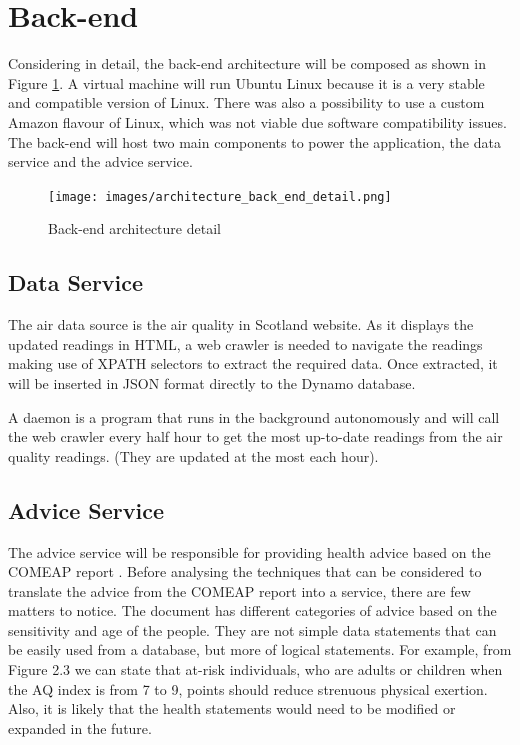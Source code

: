\section{Back-end}
Considering in detail, the back-end architecture will be composed as shown in Figure \ref{fig:architecture_back_end_detail}. A virtual machine will run Ubuntu Linux because it is a very stable and compatible version of Linux. There was also a possibility to use a custom Amazon flavour of Linux, which was not viable due software compatibility issues. The back-end will host two main components to power the application, the data service and the advice service. 

\begin{figure}[H]
\begin{adjustbox}{width=.6\textwidth,center=\textwidth}
  \centering
  \texttt{[image: images/architecture\_back\_end\_detail.png]}
\end{adjustbox}
  \caption[Back-end architecture]{Back-end architecture detail}
  \label{fig:architecture_back_end_detail}
\end{figure}


\subsection{Data Service}
 The air data source is the air quality in Scotland website. As it displays the updated readings in HTML, a web crawler is needed to navigate the readings making use of XPATH selectors to extract the required data. Once extracted, it will be inserted in JSON format directly to the Dynamo database.
 
A daemon is a program that runs in the background autonomously and will call the web crawler every half hour to get the most up-to-date readings from the air quality readings. (They are updated at the most each hour). 

\subsection{Advice Service}
The advice service will be responsible for providing health advice based on the COMEAP report \cite{HealthProtectionAgencyfortheCommitteeontheMedicalEffectsofAirPollutants2011}. Before analysing the techniques that can be considered to translate the advice from the COMEAP report into a service, there are few matters to notice. The document has different categories of advice based on the sensitivity and age of the people. They are not simple data statements that can be easily used from a database, but more of logical statements. For example, from Figure 2.3 we can state that at-risk individuals, who are adults or children when the AQ index is from 7 to 9, points should reduce strenuous physical exertion. Also, it is likely that the health statements would need to be modified or expanded in the future. 

